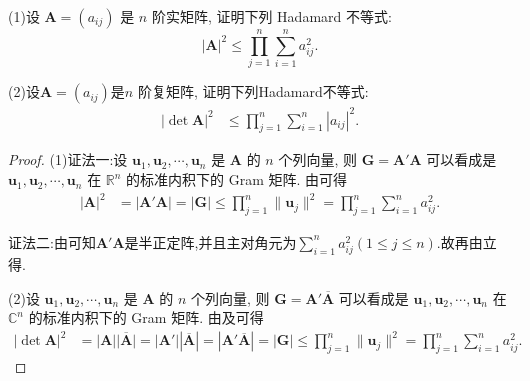 \documentclass[../../main.tex]{subfiles}%
\begin{document}
\begin{proposition}\label{proposition:矩阵的Hadamard不等式-例9.17}
(1)设 $\boldsymbol{A} = (a_{ij})$ 是 $n$ 阶实矩阵, 证明下列 Hadamard 不等式:
\[
|\boldsymbol{A}|^2 \leqslant  \prod_{j = 1}^{n} \sum_{i = 1}^{n} a_{ij}^2.
\]

(2)设$\boldsymbol{A} = (a_{ij})$是$n$ 阶复矩阵, 证明下列Hadamard不等式:
\begin{align*}
|\det \boldsymbol{A}|^2 &\leqslant  \prod_{j = 1}^{n} \sum_{i = 1}^{n} |a_{ij}|^2.
\end{align*} 
\end{proposition}
\begin{proof}

(1){\color{blue}证法一:}设 $\boldsymbol{u}_1,\boldsymbol{u}_2,\cdots,\boldsymbol{u}_n$ 是 $\boldsymbol{A}$ 的 $n$ 个列向量, 则 $\boldsymbol{G} = \boldsymbol{A}'\boldsymbol{A}$ 可以看成是 $\boldsymbol{u}_1,\boldsymbol{u}_2,\cdots,\boldsymbol{u}_n$ 在 $\mathbb{R}^n$ 的标准内积下的 Gram 矩阵. 由可得
\begin{align*}
|\boldsymbol{A}|^2 &= |\boldsymbol{A}'\boldsymbol{A}| = |\boldsymbol{G}| \leqslant  \prod_{j = 1}^{n} \|\boldsymbol{u}_j\|^2 = \prod_{j = 1}^{n} \sum_{i = 1}^{n} a_{ij}^2.
\end{align*} 

{\color{blue}证法二:}由可知$\boldsymbol{A}'\boldsymbol{A}$是半正定阵,并且主对角元为$\sum_{i = 1}^{n} a_{ij}^2(1\leqslant  j\leqslant  n)$.故再由立得.


(2)设 $\boldsymbol{u}_1,\boldsymbol{u}_2,\cdots,\boldsymbol{u}_n$ 是 $\boldsymbol{A}$ 的 $n$ 个列向量, 则 $\boldsymbol{G} = \boldsymbol{A}'\overline{\boldsymbol{A}}$ 可以看成是 $\boldsymbol{u}_1,\boldsymbol{u}_2,\cdots,\boldsymbol{u}_n$ 在 $\mathbb{C}^n$ 的标准内积下的 Gram 矩阵. 由及可得
\begin{align*}
|\det \boldsymbol{A}|^2 &= \left| \boldsymbol{A} \right|\overline{\left| \boldsymbol{A} \right|}=\left| \boldsymbol{A}' \right|\left| \overline{\boldsymbol{A}} \right|= |\boldsymbol{A}'\overline{\boldsymbol{A}}| = |\boldsymbol{G}| \leqslant  \prod_{j = 1}^{n} \|\boldsymbol{u}_j\|^2 = \prod_{j = 1}^{n} \sum_{i = 1}^{n} a_{ij}^2.
\end{align*} 

\end{proof}
\end{document}
